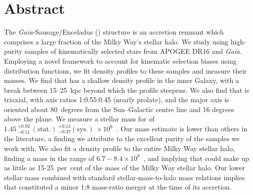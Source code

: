 \section{Abstract}
The \textit{Gaia}-Sausage/Enceladus (\gse) structure is an accretion remnant which comprises a large fraction of the Milky Way's stellar halo. We study \gse using high-purity samples of kinematically selected stars from APOGEE DR16 and \textit{Gaia}. Employing a novel framework to account for kinematic selection biases using distribution functions, we fit density profiles to these \gse samples and measure their masses. We find that \gse has a shallow density profile in the inner Galaxy, with a break between 15--25~kpc beyond which the profile steepens. We also find that \gse is triaxial, with axis ratios 1:0.55:0.45 (nearly prolate), and the major axis is oriented about 80~degrees from the Sun--Galactic centre line and 16 degrees above the plane. We measure a stellar mass for \gse of $1.45\,^{+0.92}_{-0.51}\,\mathrm{(stat.)}\,^{+0.13}_{-0.37} \mathrm{(sys.)}\ \times10^{8}$~\Msun. Our mass estimate is lower than others in the literature, a finding we attribute to the excellent purity of the samples we work with. We also fit a density profile to the entire Milky Way stellar halo, finding a mass in the range of $6.7-8.4 \times 10^{8}$~\Msun, and implying that \gse could make up as little as 15-25~per~cent of the mass of the Milky Way stellar halo. Our lower stellar mass combined with standard stellar-mass-to-halo mass relations implies that \gse constituted a minor 1:8 mass-ratio merger at the time of its accretion. 




